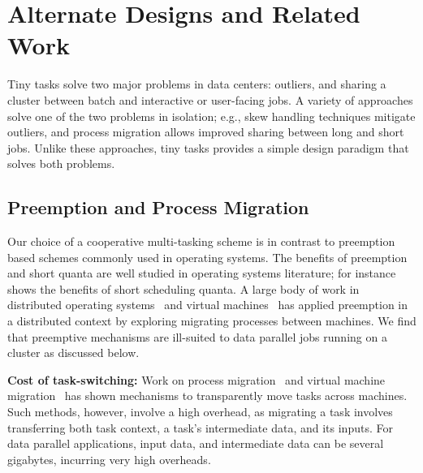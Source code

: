 \section{Alternate Designs and Related Work}
\label{sec:alternate}

Tiny tasks solve two major problems in data centers: outliers, and sharing
a cluster between batch and interactive or user-facing jobs. A variety of
approaches solve one of the two problems in isolation; e.g., skew handling
techniques mitigate outliers, and process migration allows improved
sharing between long and short jobs.  Unlike these approaches, tiny tasks
provides a simple design paradigm that solves both problems.

\subsection{Preemption and Process Migration}

Our choice of a cooperative multi-tasking scheme is in contrast to
preemption based schemes commonly used in operating systems. The benefits of
preemption and short quanta are well studied in operating
systems literature; for instance~\cite{sherman1972trace} shows the benefits
of short scheduling quanta. A large body of work in distributed
operating systems~\cite{douglis1991transparent,milojivcic2000process,rozier1991overview} and virtual machines~\cite{tanenbaum1990experiences}
has applied preemption in a distributed context by exploring migrating
processes between machines.
We find that preemptive mechanisms are
ill-suited to data parallel jobs running on a cluster as discussed below.

\vspace{4pt}\noindent\textbf{Cost of task-switching:}
Work on process
migration~\cite{douglis1991transparent,milojivcic2000process} and virtual
machine migration~\cite{clark2005live} has shown mechanisms to transparently
move tasks across machines. Such methods, however, involve a high overhead, as
migrating a task involves transferring both task context, a task's intermediate
data, and its inputs. For data parallel applications, input data, and intermediate
data can be several gigabytes, incurring very high overheads.

